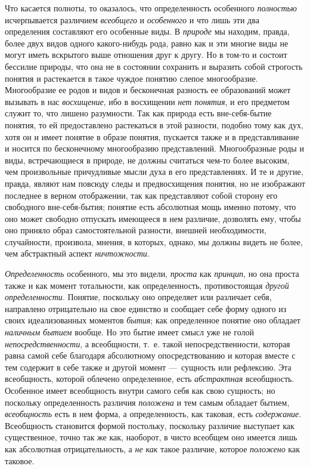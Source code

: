 \documentclass[twoside]{article}
\begin{document}
{{Что касается полноты, то оказалось, что определенность
особенного {\em полностью}
исчерпывается различием
{\em всеобщего} и
{\em особенного} и что
лишь эти два определения составляют его особенные виды. В
{\em природе} мы находим,
правда, более двух видов одного какого-нибудь рода, равно как и эти многие
виды не могут иметь вскрытого выше отношения друг к другу. Но в том-то и
состоит бессилие природы, что она не в состоянии сохранить и выразить собой
строгость понятия и растекается в такое чуждое понятию слепое многообразие.
Многообразие ее родов и видов и бесконечная разность ее образований может
вызывать в нас {\em восхищение},
ибо в восхищении {\em нет
понятия}, и его предметом служит то, что лишено разумности.
Так как природа есть вне-себя-бытие понятия, то ей предоставлено
растекаться в этой разности, подобно тому как дух, хотя он и имеет понятие
в образе понятия, пускается также и в представливание и носится по
бесконечному многообразию представлений. Многообразные роды и виды,
встречающиеся в природе, не должны считаться чем-то более высоким, чем
произвольные причудливые мысли духа в его представлениях. И те и другие,
правда, являют нам повсюду следы и предвосхищения понятия, но не изображают
последнее в верном отображении, так как представляют собой сторону его
свободного вне-себя-бытия; понятие есть абсолютная мощь именно потому, что
оно может свободно отпускать имеющееся в нем различие, дозволять ему, чтобы
оно приняло образ самостоятельной разности, внешней необходимости,
случайности, произвола, мнения, в которых, однако, мы должны видеть не
более, чем абстрактный аспект
{\em ничтожности}.

{\em Определенность}
особенного, мы это видели,
{\em проста} как
{\em принцип}, но она
проста также и как момент тотальности, как определенность, противостоящая
{\em другой определенности}.
Понятие, поскольку оно определяет или различает себя,
направлено отрицательно на свое единство и сообщает себе форму одного из
своих идеализованных моментов
{\em бытия}; как
определенное понятие оно обладает
{\em наличным бытием}
вообще. Но это бытие имеет смысл уже не голой
{\em непосредственности},
а всеобщности, т.~е. такой непосредственности, которая равна
самой себе благодаря абсолютному опосредствованию и которая вместе с тем
содержит в себе также и другой момент —~сущность или
рефлексию. Эта всеобщность, которой облечено определенное, есть
{\em абстрактная}
всеобщность. Особенное имеет всеобщность внутри самого себя
как свою сущность; но поскольку определенность различия
{\em положена} и тем
самым обладает бытием,
{\em всеобщность} есть в
нем форма, а определенность, как таковая, есть
{\em содержание}.
Всеобщность становится формой постольку, поскольку различие
выступает как существенное, точно так же как, наоборот, в чисто всеобщем
оно имеется лишь как абсолютная отрицательность, а
{\em не как} такое
различие, которое {\em положено}
как таковое.

}}
\end{document}
